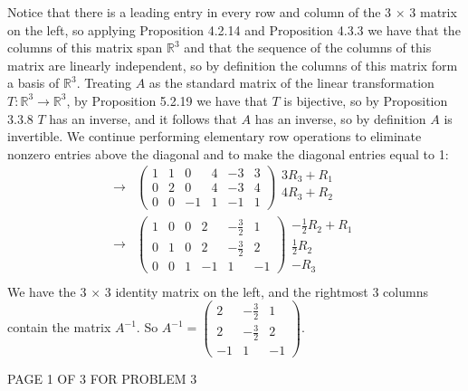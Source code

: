 \documentclass[12pt]{article}
\newenvironment{problem}[2][Problem]
{
	\begin{trivlist} 
		\item[\hskip \labelsep {\bfseries #1 #2:}]
	}
{
	\end{trivlist}
	}
\newenvironment{solution}[1][Solution]
{
	\begin{trivlist} 
		\item[\hskip \labelsep {\itshape #1:}]
	}
	{
	\end{trivlist}
}
\begin{document}
\begin{problem}{3}
\begin{solution}
Notice that there is a leading entry in every row and column of the 3 $\times$ 3 matrix on the left, so applying Proposition 4.2.14 and Proposition 4.3.3 we have that the columns of this matrix span $\mathbb{R}^3$ and that the sequence of the columns of this matrix are linearly independent, so by definition the columns of this matrix form a basis of $\mathbb{R}^3$. Treating $A$ as the standard matrix of the linear transformation $T:\mathbb{R}^3 \to \mathbb{R}^3$, by Proposition 5.2.19 we have that $T$ is bijective, so by Proposition 3.3.8 $T$ has an inverse, and it follows that $A$ has an inverse, so by definition $A$ is invertible. We continue performing elementary row operations to eliminate nonzero entries above the diagonal and to make the diagonal entries equal to 1:
\begin{align*}
%
\rightarrow & \begin{pmatrix} 1&1&0&4&-3&3\\0&2&0&4&-3&4\\0&0&-1&1&-1&1 \end{pmatrix}\begin{matrix} 3R_3+R_1 \text{} \\ 4R_3+R_2 \text{} \\ \text{} \end{matrix} \\
%
\rightarrow & \begin{pmatrix} 1&0&0&2&-\frac{3}{2}&1\\0&1&0&2&-\frac{3}{2}&2\\0&0&1&-1&1&-1 \end{pmatrix}\begin{matrix} -\frac{1}{2}R_2 +R_1 \text{} \\ \frac{1}{2}R_2 \text{} \\ -R_3 \text{} \end{matrix} \\
\end{align*}
We have the 3 $\times$ 3 identity matrix on the left, and the rightmost 3 columns contain the matrix $A^{-1}$. So $A^{-1} = \begin{pmatrix} 2&-\frac{3}{2}&1\\2&-\frac{3}{2}&2\\-1&1&-1\end{pmatrix}$.
\vfill
\centerline{PAGE 1 OF 3 FOR PROBLEM 3}
\end{solution}
\end{problem}
\end{document}
